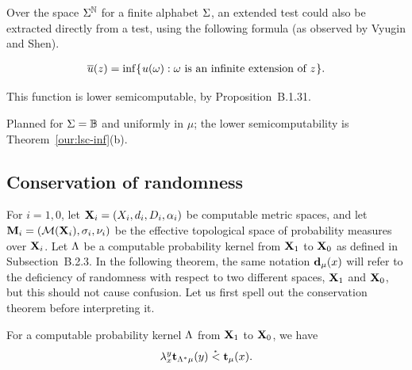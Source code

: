 Over the space \( \Sigma^{\mathbb{N}} \) for a finite alphabet \( \Sigma \),
an extended test could also be extracted directly from a test, 
using the following formula (as observed by Vyugin and Shen).

\begin{definition}\label{def:ol-u}
 \begin{align*}
   \overline{u}(z) = \inf\mathopen\{\mskip 1muu(\omega) : \omega\text{ is an infinite extension of } z\mskip 1mu\mathclose\}.
 \end{align*}
\end{definition}
This function is lower semicomputable, by Proposition~B.1.31.

\begin{formalization}
Planned for $\Sigma = \mathbb{B}$ and uniformly in $\mu$; the lower semicomputability is
Theorem~\ref{our:lsc-inf}(b).
\end{formalization}


\subsection{Conservation of randomness}

For \( i=1,0 \), let
\( \mathbf{X}_{i} = (X_{i}, d_{i}, D_{i}, \alpha_{i}) \) be computable metric spaces, 
and let \( \mathbf{M}_{i} = (\mathcal{M}(\mathbf{X}_{i}), \sigma_{i}, \nu_{i}) \) 
be the effective topological space of
probability measures over \( \mathbf{X}_{i} \).
Let \( \Lambda \) be a computable probability kernel from \( \mathbf{X}_{1} \) to \( \mathbf{X}_{0} \) as
defined in Subsection~B.2.3.
In the following theorem, the same notation \( \mathbf{d}_{\mu}(x) \) will
refer to the deficiency of randomness with respect to two different spaces,
\( \mathbf{X}_{1} \) and \( \mathbf{X}_{0} \), but this should not cause confusion.
Let us first spell out the conservation theorem before interpreting it.

 \begin{theorem}\label{propo:conservation}
For a computable probability kernel \( \Lambda \) from \( \mathbf{X}_{1} \) to \( \mathbf{X}_{0} \),
we have 
 \begin{equation}\label{eq:conservation}
  \lambda_{x}^{y} \mathbf{t}_{\Lambda^{*}\mu}(y) \stackrel{{}_*}{<} \mathbf{t}_{\mu}(x).
 \end{equation}
 \end{theorem}

